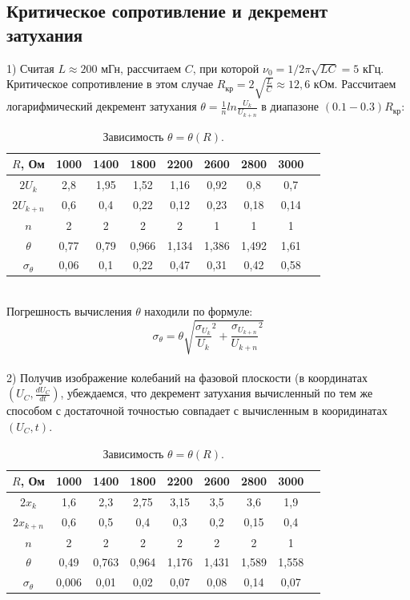 \documentclass[11pt]{article}
\begin{document}
\subsection{Критическое сопротивление и декремент затухания}
1) Считая $L \approx 200$ мГн, рассчитаем $C$, при которой $\nu_0 = 1/2\pi \sqrt{LC} = 5$ кГц. Критическое сопротивление в этом случае $R_{кр} = 2\sqrt{\frac{L}{C}} \approx 12,6$ кОм. Рассчитаем логарифмический декремент затухания $\theta = \frac{1}{n}ln\frac{U_k}{U_{k+n}}$ в диапазоне $(0.1 - 0.3)R_{кр}$:\\
\begin{table}[h]
\centering
\begin{tabular}{|c|c|c|c|c|c|c|c|c|}
\hline
$R$, Ом     & 1000 & 1400 & 1800 & 2200 & 2600 & 2800 & 3000\\
\hline
$2U_k$ & 2,8 & 1,95 & 1,52 & 1,16 & 0,92 & 0,8 & 0,7\\ \hline
$2U_{k+n}$ & 0,6 & 0,4 & 0,22 & 0,12 & 0,23 & 0,18 & 0,14\\ \hline
$n$ & 2 & 2 & 2 & 2 & 1 & 1 & 1 \\ \hline
$\theta$ & 0,77 & 0,79 & 0,966 & 1,134 & 1,386 & 1,492 & 1,61\\ \hline
$\sigma_{\theta}$ & 0,06 & 0,1 & 0,22 & 0,47 & 0,31 & 0,42 & 0,58\\
\hline
\end{tabular}
\caption{Зависимость $\theta = \theta(R)$.}
\end{table}\\
Погрешность вычисления $\theta$ находили по формуле:\\
$$\sigma_{\theta} = \theta \sqrt{\frac{\sigma_{U_k}}{U_k}^2 + \frac{\sigma_{U_{k+n}}}{U_{k+n}}^2}$$\\
2) Получив изображение колебаний на фазовой плоскости (в координатах $\left(U_C, \frac{dU_C}{dt}\right)$, убеждаемся, что декремент затухания вычисленный по тем же способом с достаточной точностью совпадает с вычисленным в кооридинатах $\left( U_C, t\right)$.\\
\begin{table}[h]
\centering
\begin{tabular}{|c|c|c|c|c|c|c|c|c|}
\hline
$R$, Ом     & 1000 & 1400 & 1800 & 2200 & 2600 & 2800 & 3000\\
\hline
$2x_k$ & 1,6 & 2,3 & 2,75 & 3,15 & 3,5 & 3,6 & 1,9\\ \hline
$2x_{k+n}$ & 0,6 & 0,5 & 0,4 & 0,3 & 0,2 & 0,15 & 0,4\\ \hline
$n$ & 2 & 2 & 2 & 2 & 2 & 2 & 1 \\ \hline
$\theta$ & 0,49 & 0,763 & 0,964 & 1,176 & 1,431 & 1,589 & 1,558\\ \hline
$\sigma_{\theta}$ & 0,006 & 0,01 & 0,02 & 0,07 & 0,08 & 0,14 & 0,07\\
\hline
\end{tabular}
\caption{Зависимость $\theta = \theta(R)$.}
\end{table}\\
\end{document}
